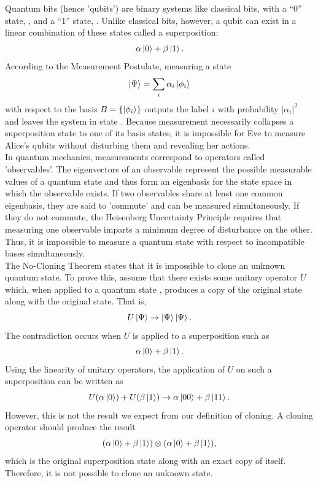\documentclass[conference]{IEEEtran}
\begin{document}
Quantum bits (hence 'qubits') are binary systems like classical bits, with a ``0'' state, , and a ``1'' state, . Unlike classical bits, however, a qubit can exist in a linear combination of these states called a superposition: \[ \alpha\left\vert{0}\right\rangle + \beta\left\vert{1}\right\rangle. \]According to the Measurement Postulate\cite{Kaye}, measuring a state \[ \left\vert{\Psi}\right\rangle = \sum_{i}\alpha_i\left\vert{\phi_i}\right\rangle \]with respect to the basis $B = \{\left\vert{\phi_i}\right\rangle\}$ outputs the label $i$ with probability $|\alpha_i|^2$ and leaves the system in state . Because measurement necessarily collapses a superposition state to one of its basis states, it is impossible for Eve to measure Alice's qubits without disturbing them and revealing her actions.\\

In quantum mechanics, measurements correspond to operators called 'observables'. The eigenvectors of an observable represent the possible measurable values of a quantum state and thus form an eigenbasis for the state space in which the observable exists\cite{Wimmel}. If two observables share at least one common eigenbasis, they are said to 'commute' and can be measured simultaneously. If they do not commute, the Heisenberg Uncertainty Principle requires that measuring one observable imparts a minimum degree of disturbance on the other\cite{Williams}. Thus, it is impossible to measure a quantum state with respect to incompatible bases simultaneously.\\

The No-Cloning Theorem states that it is impossible to clone an unknown quantum state\cite{Wootters}. To prove this, assume that there exists some unitary operator $U$ which, when applied to a quantum state \ket{\Psi}, produces a copy of the original state along with the original state. That is, \[ U\left\vert{\Psi}\right\rangle\rightarrow\left\vert{\Psi}\right\rangle\left\vert{\Psi}\right\rangle. \]The contradiction occurs when $U$ is applied to a superposition such as \[ \alpha\left\vert{0}\right\rangle + \beta\left\vert{1}\right\rangle. \]Using the linearity of unitary operators, the application of $U$ on such a superposition can be written as \[ U(\alpha\left\vert{0}\right\rangle) + U(\beta\left\vert{1}\right\rangle)\rightarrow\alpha\left\vert{00}\right\rangle + \beta\left\vert{11}\right\rangle. \]However, this is not the result we expect from our definition of cloning. A cloning operator should produce the result \[(\alpha\left\vert{0}\right\rangle + \beta\left\vert{1}\right\rangle)\otimes(\alpha\left\vert{0}\right\rangle + \beta\left\vert{1}\right\rangle), \]which is the original superposition state along with an exact copy of itself. Therefore, it is not possible to clone an unknown state\cite{Williams}.\\
\end{document}
